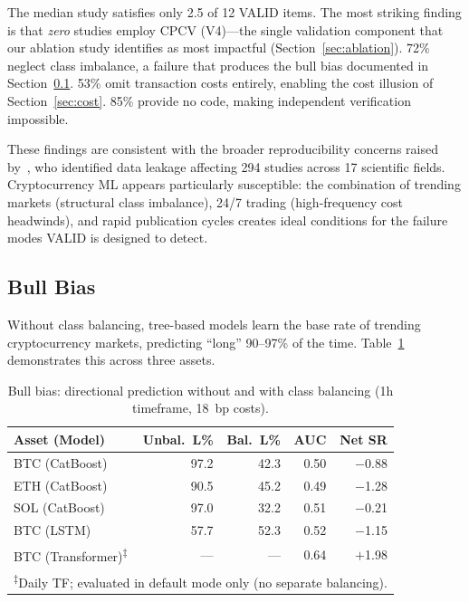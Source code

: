 \documentclass[sigconf,anonymous,review]{acmart}
\begin{document}
The median study satisfies only 2.5 of 12 VALID items. The most
striking finding is that \emph{zero} studies employ CPCV (V4)---the
single validation component that our ablation study identifies as
most impactful (Section~\ref{sec:ablation}). 72\% neglect class
imbalance, a failure that produces the bull bias documented in
Section~\ref{sec:bull}. 53\% omit transaction costs entirely,
enabling the cost illusion of Section~\ref{sec:cost}. 85\% provide
no code, making independent verification impossible.

These findings are consistent with the broader reproducibility
concerns raised by~\citet{kapoor2023leakage}, who identified data
leakage affecting 294 studies across 17 scientific fields.
Cryptocurrency ML appears particularly susceptible: the combination
of trending markets (structural class imbalance), 24/7 trading
(high-frequency cost headwinds), and rapid publication cycles
creates ideal conditions for the failure modes VALID is designed to
detect.


\subsection{Bull Bias}
\label{sec:bull}

Without class balancing, tree-based models learn the base rate of
trending cryptocurrency markets, predicting ``long'' 90--97\% of the
time. Table~\ref{tab:bullbias} demonstrates this across three assets.

\begin{table}[t]
\centering
\caption{Bull bias: directional prediction without and with class
balancing (1h timeframe, 18~bp costs).}
\label{tab:bullbias}
\small
\begin{tabular}{lrrrr}
\toprule
Asset (Model) & Unbal.\ L\% & Bal.\ L\% & AUC & Net SR \\
\midrule
BTC (CatBoost) & 97.2 & 42.3 & 0.50 & $-$0.88 \\
ETH (CatBoost) & 90.5 & 45.2 & 0.49 & $-$1.28 \\
SOL (CatBoost) & 97.0 & 32.2 & 0.51 & $-$0.21 \\
BTC (LSTM) & 57.7 & 52.3 & 0.52 & $-$1.15 \\
BTC (Transformer)\textsuperscript{$\ddagger$} & --- & --- & 0.64 & $+$1.98 \\
\bottomrule
\multicolumn{5}{l}{\footnotesize \textsuperscript{$\ddagger$}Daily
TF; evaluated in default mode only (no separate balancing).}
\end{tabular}
\end{table}
\end{document}
